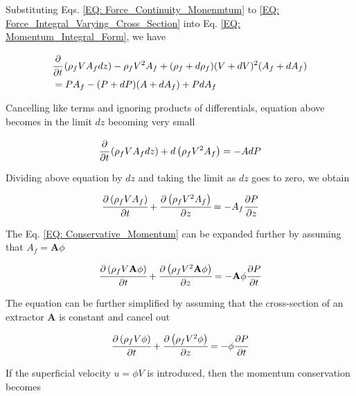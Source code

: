 \documentclass[../Article_Model_Parameters.tex]{subfiles}
\begin{document}
	Substituting Eqs. \ref{EQ: Force_Continuity_Monenmtum} to \ref{EQ: Force_Integral_Varying_Cross_Section} into Eq. \ref{EQ: Momentum_Integral_Form}, we have
	
	{\footnotesize
		\begin{align}
			& \cfrac{\partial}{\partial t} \left( \rho_f V A_f dz \right) - \rho_f V^2 A_f + (\rho_f + d\rho_f)(V+dV)^2(A_f+dA_f)  \nonumber \\
			&= PA_f - (P+dP)(A+dA_f)+PdA_f
		\end{align}
	}
	
	Cancelling like terms and ignoring products of differentials, equation above becomes in the limit $dz$ becoming  very small
	
	{\footnotesize
		\begin{equation}
			\cfrac{\partial}{\partial t} \left( \rho_f V A_f dz \right) + d\left( \rho_f V^2 A_f \right) = -A dP
		\end{equation}
	}

	Dividing above equation by $dz$ and taking the limit as $dz$ goes to zero, we obtain
	
	{\footnotesize
		\begin{equation}
			\cfrac{\partial \left( \rho_f V A_f \right)}{\partial t} + \cfrac{\partial \left( \rho_f V^2 A_f \right)}{\partial z} = -A_f \cfrac{\partial P}{\partial z}
			\label{EQ: Conservative_Momentum}
		\end{equation}
	}

	The Eq. \ref{EQ: Conservative_Momentum} can be expanded further by assuming that $A_f = \textbf{A}\phi$ 
	
	{\footnotesize
		\begin{equation}
			\cfrac{\partial \left( \rho_f V \textbf{A} \phi \right) }{\partial t} + \cfrac{\partial \left( \rho_f V^2 \textbf{A} \phi \right) }{\partial z} = - 	\textbf{A} \phi \cfrac{\partial P}{\partial t}
		\end{equation}
	}

	The equation can be further simplified by assuming that the cross-section of an extractor $\textbf{A}$ is constant and cancel out
	
	{\footnotesize
		\begin{equation}
			\cfrac{\partial \left( \rho_f V \phi \right) }{\partial t} + \cfrac{\partial \left( \rho_f V^2 \phi \right) }{\partial z} = - \phi 	\cfrac{\partial P}{\partial t}
		\end{equation}
	}

	If the superficial velocity $u=\phi V$ is introduced, then the momentum conservation becomes
	
\end{document}
